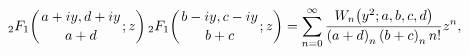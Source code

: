 \[\mathop{{{}_{2}F_{1}}\/}\nolimits\!\left({a+iy,d+iy\atop a+d};z\right)\mathop{%
{{}_{2}F_{1}}\/}\nolimits\!\left({b-iy,c-iy\atop b+c};z\right)=\sum_{n=0}^{%
\infty}\frac{\mathop{W_{n}\/}\nolimits\!\left(y^{2};a,b,c,d\right)}{\left(a+d%
\right)_{n}\left(b+c\right)_{n}n!}z^{n},\]